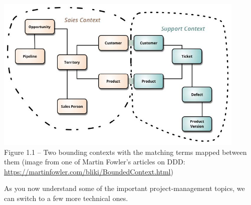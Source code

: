\begin{center}
\includegraphics[width=0.9\textwidth]{content/1/chapter1/images/1.jpg}\\
Figure 1.1 – Two bounding contexts with the matching terms mapped between them (image from one of Martin Fowler's articles on DDD: \url{https://martinfowler.com/bliki/BoundedContext.html})

\end{center}

As you now understand some of the important project-management topics, we can switch to a few more technical ones.









